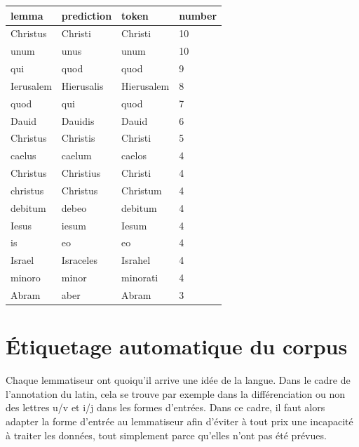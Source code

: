 \begin{table}[]
\begin{tabular}{@{}llll@{}}
\toprule
lemma     & prediction & token      & number \\ \midrule
Christus  & Christi    & Christi    & 10     \\
unum      & unus       & unum       & 10     \\
qui       & quod       & quod       & 9      \\
Ierusalem & Hierusalis & Hierusalem & 8      \\
quod      & qui        & quod       & 7      \\
Dauid     & Dauidis    & Dauid      & 6      \\
Christus  & Christis   & Christi    & 5      \\
caelus    & caelum     & caelos     & 4      \\
Christus  & Christius  & Christi    & 4      \\
christus  & Christus   & Christum   & 4      \\
debitum   & debeo      & debitum    & 4      \\
Iesus     & iesum      & Iesum      & 4      \\
is        & eo         & eo         & 4      \\
Israel    & Israceles  & Israhel    & 4      \\
minoro    & minor      & minorati   & 4      \\
Abram     & aber       & Abram      & 3      \\ \bottomrule
\end{tabular}
\end{table}

\section{Étiquetage automatique du corpus}


Chaque lemmatiseur ont quoiqu'il arrive une idée de la langue. Dans le cadre de l'annotation du latin, cela se trouve par exemple dans la différenciation ou non des lettres u/v et i/j dans les formes d'entrées. Dans ce cadre, il faut alors adapter la forme d'entrée au lemmatiseur afin d'éviter à tout prix une incapacité à traiter les données, tout simplement parce qu'elles n'ont pas été prévues. %


